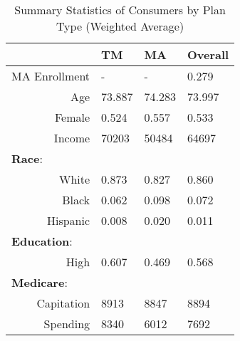 \begin{table}[ht]
  \scriptsize
  \centering
  \caption{Summary Statistics of Consumers by Plan Type (Weighted Average)} %
  \begin{tabular}{r|lll}
    \toprule
    & \textbf{TM} & \textbf{MA} & \textbf{Overall} \\
    \midrule
    MA Enrollment & - & - & 0.279 \\
    Age & 73.887 & 74.283 & 73.997 \\
    Female & 0.524 & 0.557 & 0.533 \\
    Income & 70203 & 50484 & 64697 \\
    \midrule
    \multicolumn{4}{l}{\textbf{Race}:} \\
    White & 0.873 & 0.827 & 0.860 \\
    Black & 0.062 & 0.098 & 0.072 \\
    Hispanic & 0.008 & 0.020 & 0.011 \\
    \midrule
    \multicolumn{4}{l}{\textbf{Education}:} \\
    High & 0.607 & 0.469 & 0.568 \\
    \midrule
    \multicolumn{4}{l}{\textbf{Medicare}:} \\
    Capitation & 8913 & 8847 & 8894 \\
    Spending & 8340 & 6012 & 7692 \\
    \bottomrule
  \end{tabular}
  \label{tab:consumer_summary}
\end{table}